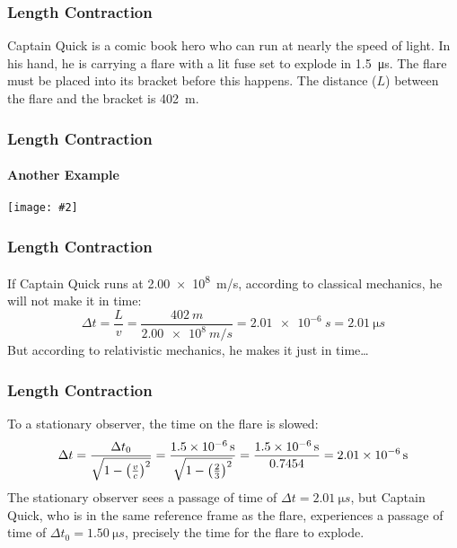 \documentclass[12pt,compress,aspectratio=169]{beamer}
\newcommand{\pic}[2]{\texttt{[image: \#2]}}
\newcommand{\bigsqrt}{\ensuremath\sqrt{1-\left(\frac{v}{c}\right)^2}}
\begin{document}
\begin{frame}
  \frametitle{Length Contraction}
  Captain Quick is a comic book hero who can run at nearly the speed of light.
  In his hand, he is carrying a flare with a lit fuse set to explode in
  \SI{1.5}{\micro s}. The flare must be placed into its bracket before this
  happens. The distance ($L$) between the flare and the bracket is \SI{402}{m}.
\end{frame}


\begin{frame}
  \frametitle{Length Contraction}
  \framesubtitle{Another Example}
  \begin{center}
    \pic{.85}{captain-quick.png}
  \end{center}
\end{frame}


\begin{frame}
  \frametitle{Length Contraction}
  If Captain Quick runs at \SI{2.00e8}{m/s}, according to classical mechanics,
  he will not make it in time:
  \begin{displaymath}
    \Delta t= \frac{L}{v}=\frac{\SI{402}{m}}{\SI{2.00e8}{m/s}}
    =\SI{2.01e-6}{s}=\SI{2.01}{\micro s}
  \end{displaymath}
  But according to relativistic mechanics, he makes it just in time\ldots
\end{frame}

\begin{frame}
  \frametitle{Length Contraction}
  To a stationary observer, the time on the flare is slowed:
  \begin{displaymath}
    \Delta t 
    = \frac{\Delta t_0}{\bigsqrt}
    = \frac{\SI{1.5e-6}{s}}{\sqrt{1-\left(\frac{2}{3}\right)^2}}
    = \frac{\SI{1.5e-6}{s}}{0.7454}
    = \SI{2.01e-6}{s}
  \end{displaymath}
  The stationary observer sees a passage of time of
  $\Delta t=\SI{2.01}{\micro s}$, but
  Captain Quick, who is in the same reference frame as the flare, experiences
  a passage of time of $\Delta t_0=\SI{1.50}{\micro s}$, precisely the time for
  the flare to explode.
\end{frame}
\end{document}
